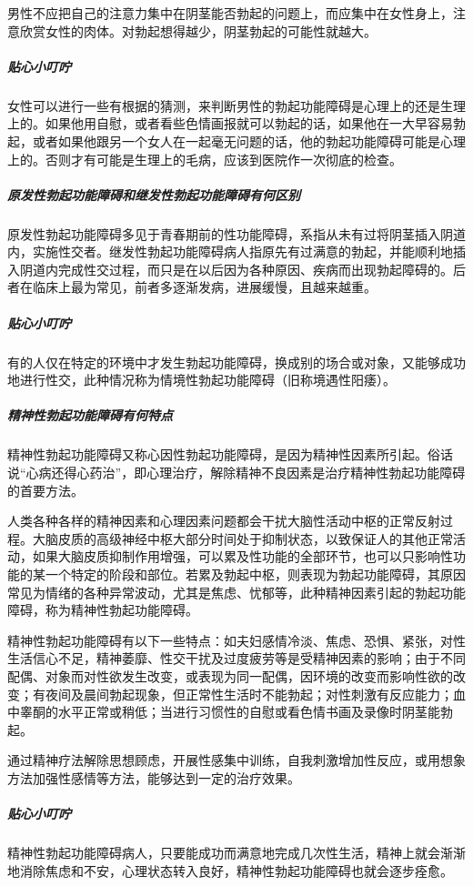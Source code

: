 男性不应把自己的注意力集中在阴茎能否勃起的问题上，而应集中在女性身上，注意欣赏女性的肉体。对勃起想得越少，阴茎勃起的可能性就越大。

\subparagraph{贴心小叮咛}

女性可以进行一些有根据的猜测，来判断男性的勃起功能障碍是心理上的还是生理上的。如果他用自慰，或者看些色情画报就可以勃起的话，如果他在一大早容易勃起，或者如果他跟另一个女人在一起毫无问题的话，他的勃起功能障碍可能是心理上的。否则才有可能是生理上的毛病，应该到医院作一次彻底的检查。

\subparagraph{原发性勃起功能障碍和继发性勃起功能障碍有何区别}

原发性勃起功能障碍多见于青春期前的性功能障碍，系指从未有过将阴茎插入阴道内，实施性交者。继发性勃起功能障碍病人指原先有过满意的勃起，并能顺利地插入阴道内完成性交过程，而只是在以后因为各种原因、疾病而出现勃起障碍的。后者在临床上最为常见，前者多逐渐发病，进展缓慢，且越来越重。

\subparagraph{贴心小叮咛}

有的人仅在特定的环境中才发生勃起功能障碍，换成别的场合或对象，又能够成功地进行性交，此种情况称为情境性勃起功能障碍（旧称境遇性阳痿）。

\subparagraph{精神性勃起功能障碍有何特点}

精神性勃起功能障碍又称心因性勃起功能障碍，是因为精神性因素所引起。俗话说“心病还得心药治”，即心理治疗，解除精神不良因素是治疗精神性勃起功能障碍的首要方法。

人类各种各样的精神因素和心理因素问题都会干扰大脑性活动中枢的正常反射过程。大脑皮质的高级神经中枢大部分时间处于抑制状态，以致保证人的其他正常活动，如果大脑皮质抑制作用增强，可以累及性功能的全部环节，也可以只影响性功能的某一个特定的阶段和部位。若累及勃起中枢，则表现为勃起功能障碍，其原因常见为情绪的各种异常波动，尤其是焦虑、忧郁等，此种精神因素引起的勃起功能障碍，称为精神性勃起功能障碍。

精神性勃起功能障碍有以下一些特点：如夫妇感情冷淡、焦虑、恐惧、紧张，对性生活信心不足，精神萎靡、性交干扰及过度疲劳等是受精神因素的影响；由于不同配偶、对象而对性欲发生改变，或表现为同一配偶，因环境的改变而影响性欲的改变；有夜间及晨间勃起现象，但正常性生活时不能勃起；对性刺激有反应能力；血中睾酮的水平正常或稍低；当进行习惯性的自慰或看色情书画及录像时阴茎能勃起。

通过精神疗法解除思想顾虑，开展性感集中训练，自我刺激增加性反应，或用想象方法加强性感情等方法，能够达到一定的治疗效果。

\subparagraph{贴心小叮咛}

精神性勃起功能障碍病人，只要能成功而满意地完成几次性生活，精神上就会渐渐地消除焦虑和不安，心理状态转入良好，精神性勃起功能障碍也就会逐步痊愈。

